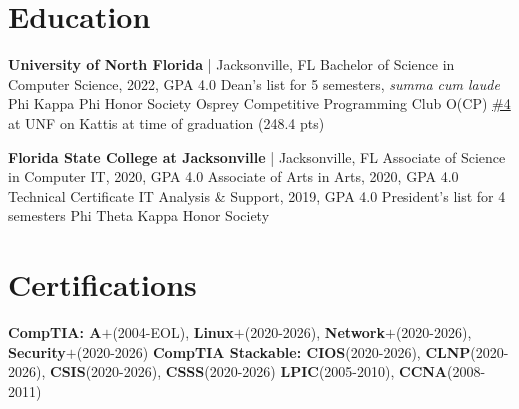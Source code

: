\documentclass[10pt]{report}
\begin{document}
\section*{Education}
\vspace{-1.5em}
\setlength{\columnsep}{-2em}
\begin{multicols}{2}
\textbf{University of North Florida} | Jacksonville, FL \newline
Bachelor of Science in Computer Science, 2022, GPA 4.0 \newline
Dean's list for 5 semesters, \textit{summa cum laude} \newline
Phi Kappa Phi Honor Society \newline
Osprey Competitive Programming Club O(CP) \newline
\href{https://open.kattis.com/universities/unf.edu}{\#4} at UNF on Kattis at time of graduation (248.4 pts)
\columnbreak

\textbf{Florida State College at Jacksonville} | Jacksonville, FL \newline
Associate of Science in Computer IT, 2020, GPA 4.0 \newline
Associate of Arts in Arts, 2020, GPA 4.0 \newline
Technical Certificate IT Analysis \& Support, 2019, GPA 4.0 \newline
President's list for 4 semesters \newline
Phi Theta Kappa Honor Society
\end{multicols}
\vspace{-1em}


\section*{Certifications}
\textbf{CompTIA: A$\bm{+}$}(2004-EOL), \textbf{Linux$\bm{+}$}(2020-2026), \textbf{Network$\bm{+}$}(2020-2026), \textbf{Security$\bm{+}$}(2020-2026)\newline
\textbf{CompTIA Stackable: CIOS}(2020-2026), \textbf{CLNP}(2020-2026), \textbf{CSIS}(2020-2026), \textbf{CSSS}(2020-2026)\newline
\textbf{LPIC}(2005-2010), \textbf{CCNA}(2008-2011)
\end{document}
